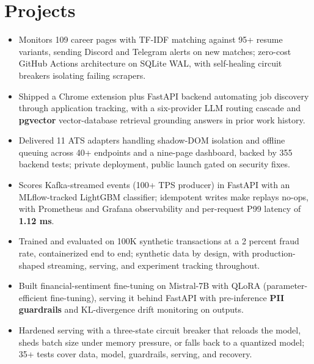 \documentclass[letterpaper,10pt]{article}
\begin{document}
\section{Projects}
\begin{itemize}
\item Monitors 109 career pages with TF-IDF matching against 95+ resume variants, sending Discord and Telegram alerts on new matches; zero-cost GitHub Actions architecture on SQLite WAL, with self-healing circuit breakers isolating failing scrapers.
\end{itemize}
\begin{itemize}
\item Shipped a Chrome extension plus FastAPI backend automating job discovery through application tracking, with a six-provider LLM routing cascade and \textbf{pgvector} vector-database retrieval grounding answers in prior work history.
\item Delivered 11 ATS adapters handling shadow-DOM isolation and offline queuing across 40+ endpoints and a nine-page dashboard, backed by 355 backend tests; private deployment, public launch gated on security fixes.
\end{itemize}
\begin{itemize}
\item Scores Kafka-streamed events (100+ TPS producer) in FastAPI with an MLflow-tracked LightGBM classifier; idempotent writes make replays no-ops, with Prometheus and Grafana observability and per-request P99 latency of \textbf{1.12 ms}.
\item Trained and evaluated on 100K synthetic transactions at a 2 percent fraud rate, containerized end to end; synthetic data by design, with production-shaped streaming, serving, and experiment tracking throughout.
\end{itemize}
\begin{itemize}
\item Built financial-sentiment fine-tuning on Mistral-7B with QLoRA (parameter-efficient fine-tuning), serving it behind FastAPI with pre-inference \textbf{PII guardrails} and KL-divergence drift monitoring on outputs.
\item Hardened serving with a three-state circuit breaker that reloads the model, sheds batch size under memory pressure, or falls back to a quantized model; 35+ tests cover data, model, guardrails, serving, and recovery.
\end{itemize}
\end{document}
